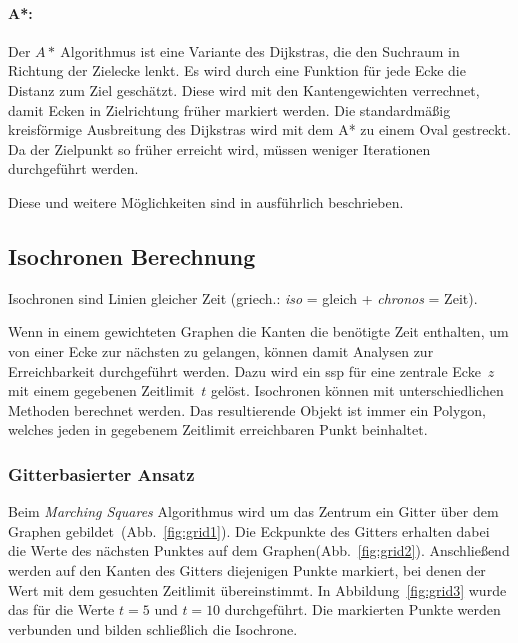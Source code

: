 \paragraph*{A*:}
Der $A*~$Algorithmus ist eine Variante des Dijkstras, die den Suchraum in Richtung der Zielecke lenkt.
Es wird durch eine Funktion für jede Ecke die Distanz zum Ziel geschätzt.
Diese wird mit den Kantengewichten verrechnet, damit Ecken in Zielrichtung früher markiert werden.
Die standardmäßig kreisförmige Ausbreitung des Dijkstras wird mit dem A* zu einem Oval gestreckt.
Da der Zielpunkt so früher erreicht wird, müssen weniger Iterationen durchgeführt werden.

Diese und weitere Möglichkeiten sind in \cite[209--213]{kurt} ausführlich beschrieben.

\subsection{Isochronen Berechnung}

Isochronen sind Linien gleicher Zeit (griech.: \textit{iso} = gleich + \textit{chronos} = Zeit).

Wenn in einem gewichteten Graphen die Kanten die benötigte Zeit enthalten, um von einer Ecke zur nächsten zu gelangen, können damit Analysen zur Erreichbarkeit durchgeführt werden.
Dazu wird ein \gls{ssp} für eine zentrale Ecke~$z$ mit einem gegebenen Zeitlimit~$t$ gelöst.
Isochronen können mit unterschiedlichen Methoden berechnet werden.
Das resultierende Objekt ist immer ein Polygon, welches jeden in gegebenem Zeitlimit erreichbaren Punkt beinhaltet.


\subsubsection{Gitterbasierter Ansatz}

Beim \textit{Marching Squares} Algorithmus wird um das Zentrum ein Gitter über dem Graphen gebildet~(Abb.~\ref{fig:grid1}).
Die Eckpunkte des Gitters erhalten dabei die Werte des nächsten Punktes auf dem Graphen(Abb.~\ref{fig:grid2}).
Anschließend werden auf den Kanten des Gitters diejenigen Punkte markiert, bei denen der Wert mit dem gesuchten Zeitlimit übereinstimmt.
In Abbildung~\ref{fig:grid3} wurde das für die Werte $t=5$ und $t=10$ durchgeführt.
Die markierten Punkte werden verbunden und bilden schließlich die Isochrone.

